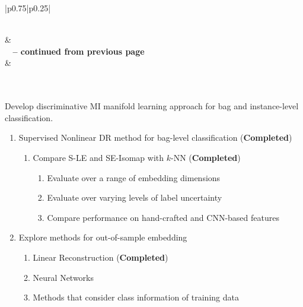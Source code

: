\begin{longtable}{|p{}|p{}|} 
	\caption[List of research tasks.]{List of research tasks and their corresponding estimated dates for completion.}
	\label{tab:future_tasks}\\
	\hline {} &  \\ \hline
	\endfirsthead
	{{\bfseries \tablename\ \thetable{} -- continued from previous page}} \\
	\hline {} &  
	\\
	\hline
	\endhead
	\hline {} \\ \hline
	\endfoot
	\hline \hline
	\endlastfoot


	 \\
	\hline
	Develop discriminative MI manifold learning approach for bag and instance-level classification.  
	\begin{enumerate}
		\item Supervised Nonlinear DR method for bag-level classification (\textbf{Completed}) \label{item:supervisedDR_bag_level}
		\begin{enumerate}
			\item Compare S-LE and SE-Isomap  with $k$-NN (\textbf{Completed})
			\begin{enumerate}
				\item Evaluate over a range of embedding dimensions
				\item Evaluate over varying levels of label uncertainty
				\item Compare performance on hand-crafted and CNN-based features
			\end{enumerate}
		\end{enumerate}
	
		\item Explore methods for out-of-sample embedding
		\begin{enumerate}
			\item Linear Reconstruction  (\textbf{Completed})
			\item Neural Networks
			\item Methods that consider class information of training data
		\end{enumerate}
		

\end{enumerate}
\end{longtable}
